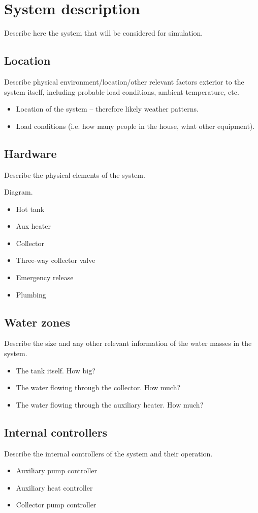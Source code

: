 \chapter{System description}
\label{ch:system}


Describe here the system that will be considered for simulation.

\section{Location}

Describe physical environment/location/other relevant factors exterior to the system itself, including probable load conditions, ambient temperature, etc.

\begin{itemize}
	\item Location of the system -- therefore likely weather patterns.
	\item Load conditions (i.e. how many people in the house, what other equipment).
\end{itemize}

\section{Hardware}

Describe the physical elements of the system.

Diagram.

\begin{itemize}
	\item Hot tank
	\item Aux heater
	\item Collector
	\item Three-way collector valve
	\item Emergency release
	\item Plumbing
\end{itemize}

\section{Water zones}

Describe the size and any other relevant information of the water masses in the system.

\begin{itemize}
	\item The tank itself. How big?
	\item The water flowing through the collector. How much?
	\item The water flowing through the auxiliary heater. How much?
\end{itemize}

\section{Internal controllers}

Describe the internal controllers of the system and their operation.

\begin{itemize}
	\item Auxiliary pump controller
	\item Auxiliary heat controller
	\item Collector pump controller
\end{itemize}
